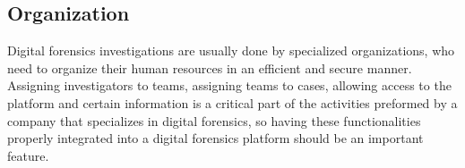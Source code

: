 \subsection{Organization}

Digital forensics investigations are usually done by specialized organizations, who need to organize their human resources in an efficient and secure manner.
Assigning investigators to teams, assigning teams to cases, allowing access to the platform and certain information is a critical part of the activities preformed by
a company that specializes in digital forensics, so having these functionalities properly integrated into a digital forensics platform should be an important feature.